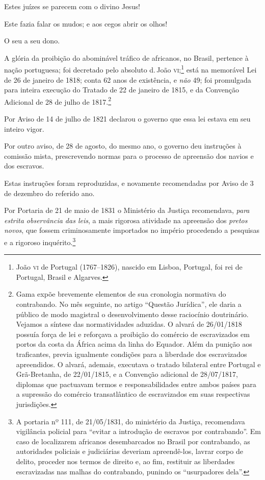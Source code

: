 {Estes juízes se parecem com o divino Jesus!

Este fazia falar os mudos; e aos cegos abrir os olhos!

\asterisc

O seu a seu dono.

A glória da proibição do abominável tráfico de africanos, no Brasil,
pertence à nação portuguesa; foi decretado pelo absoluto d.\,João
\textsc{vi};\footnote{João \textsc{vi} de Portugal (1767--1826), nascido em Lisboa,
  Portugal, foi rei de Portugal, Brasil e Algarves.} está na memorável
Lei de 26 de janeiro de 1818; conta 62 anos de existência, e \emph{não}
49; foi promulgada para inteira execução do Tratado de 22 de janeiro de
1815, e da Convenção Adicional de 28 de julho de 1817.\footnote{Gama
  expõe brevemente elementos de sua cronologia normativa do contrabando.
  No mês seguinte, no artigo ``Questão Jurídica'', ele daria a
  público de modo magistral o desenvolvimento desse raciocínio
  doutrinário. Vejamos a síntese das normatividades aduzidas. O alvará
  de 26/01/1818 possuía força de lei e reforçava a proibição do comércio
  de escravizados em portos da costa da África acima da linha do
  Equador. Além da punição aos traficantes, previa igualmente condições
  para a liberdade dos escravizados apreendidos. O alvará, ademais,
  executava o tratado bilateral entre Portugal e Grã-Bretanha, de
  22/01/1815, e a Convenção adicional de 28/07/1817, diplomas que
  pactuavam termos e responsabilidades entre ambos países para a
  supressão do comércio transatlântico de escravizados em suas
  respectivas jurisdições.}

Por Aviso de 14 de julho de 1821 declarou o governo que essa lei estava
em seu inteiro vigor.

Por outro aviso, de 28 de agosto, do mesmo ano, o governo deu instruções
à comissão mista, prescrevendo normas para o processo de apreensão dos
navios e dos escravos.

Estas instruções foram reproduzidas, e novamente recomendadas por Aviso
de 3 de dezembro do referido ano.

Por Portaria de 21 de maio de 1831 o Ministério da Justiça recomendava,
\emph{para estrita observância das leis}, a mais rigorosa atividade na
apreensão dos \emph{pretos novos}, que fossem criminosamente importados
no império procedendo a pesquisas e a rigoroso inquérito.\footnote{A
  portaria nº 111, de 21/05/1831, do ministério da Justiça, recomendava
  vigilância policial para ``evitar a introdução de escravos por
  contrabando''. Em caso de localizarem africanos desembarcados no Brasil
  por contrabando, as autoridades policiais e judiciárias deveriam
  apreendê-los, lavrar corpo de delito, proceder nos termos de
  direito e, ao fim, restituir as liberdades escravizadas nas malhas
  do contrabando, punindo os ``usurpadores dela''.}

}

